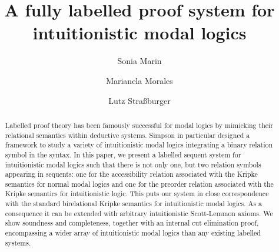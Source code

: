 \documentclass[a4paper]{article}
\title{A fully labelled proof system for intuitionistic modal logics}
\author[1]{Sonia Marin}
\author[2,3]{Marianela Morales}
\author[3,2]{Lutz Stra{\ss}burger}
\affil[1]{University College London}
\affil[2]{Laboratoire d'Informatique de l'\'Ecole Polytechnique}
\affil[3]{Inria Saclay}
\date{}
\begin{document}
  \maketitle
  
 \begin{abstract}
   Labelled proof theory has been famously successful for modal logics by mimicking their relational semantics within deductive systems. Simpson in particular designed a framework to study a variety of intuitionistic modal logics integrating a binary relation symbol in the syntax.
   In this paper, we present a labelled sequent system for
   intuitionistic modal logics such that there is not only one, but
   two relation symbols appearing in sequents: one for the accessibility
   relation associated with the Kripke semantics for normal modal logics and
   one for the preorder relation associated with the Kripke semantics
   for intuitionistic logic.
   This puts our system in close correspondence with the standard
   birelational Kripke semantics for intuitionistic modal logics. 
   As a consequence it can be extended with arbitrary intuitionistic Scott-Lemmon axioms. 
   We show soundness and completeness, together with an internal cut elimination proof, encompassing a wider array of intuitionistic modal logics than any existing labelled systems.
 \end{abstract}













\end{document}
